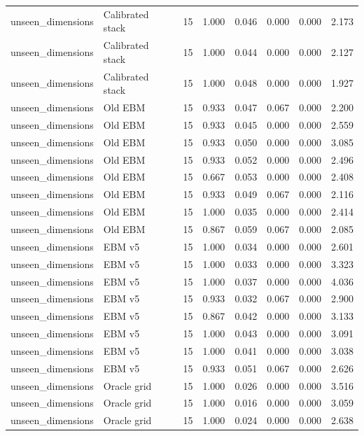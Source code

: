 {\begin{longtable}{llrrrrrr}
unseen\_dimensions & Calibrated stack & 15 & 1.000 & 0.046 & 0.000 & 0.000 & 2.173 \\
unseen\_dimensions & Calibrated stack & 15 & 1.000 & 0.044 & 0.000 & 0.000 & 2.127 \\
unseen\_dimensions & Calibrated stack & 15 & 1.000 & 0.048 & 0.000 & 0.000 & 1.927 \\
unseen\_dimensions & Old EBM & 15 & 0.933 & 0.047 & 0.067 & 0.000 & 2.200 \\
unseen\_dimensions & Old EBM & 15 & 0.933 & 0.045 & 0.000 & 0.000 & 2.559 \\
unseen\_dimensions & Old EBM & 15 & 0.933 & 0.050 & 0.000 & 0.000 & 3.085 \\
unseen\_dimensions & Old EBM & 15 & 0.933 & 0.052 & 0.000 & 0.000 & 2.496 \\
unseen\_dimensions & Old EBM & 15 & 0.667 & 0.053 & 0.000 & 0.000 & 2.408 \\
unseen\_dimensions & Old EBM & 15 & 0.933 & 0.049 & 0.067 & 0.000 & 2.116 \\
unseen\_dimensions & Old EBM & 15 & 1.000 & 0.035 & 0.000 & 0.000 & 2.414 \\
unseen\_dimensions & Old EBM & 15 & 0.867 & 0.059 & 0.067 & 0.000 & 2.085 \\
unseen\_dimensions & EBM v5 & 15 & 1.000 & 0.034 & 0.000 & 0.000 & 2.601 \\
unseen\_dimensions & EBM v5 & 15 & 1.000 & 0.033 & 0.000 & 0.000 & 3.323 \\
unseen\_dimensions & EBM v5 & 15 & 1.000 & 0.037 & 0.000 & 0.000 & 4.036 \\
unseen\_dimensions & EBM v5 & 15 & 0.933 & 0.032 & 0.067 & 0.000 & 2.900 \\
unseen\_dimensions & EBM v5 & 15 & 0.867 & 0.042 & 0.000 & 0.000 & 3.133 \\
unseen\_dimensions & EBM v5 & 15 & 1.000 & 0.043 & 0.000 & 0.000 & 3.091 \\
unseen\_dimensions & EBM v5 & 15 & 1.000 & 0.041 & 0.000 & 0.000 & 3.038 \\
unseen\_dimensions & EBM v5 & 15 & 0.933 & 0.051 & 0.067 & 0.000 & 2.626 \\
unseen\_dimensions & Oracle grid & 15 & 1.000 & 0.026 & 0.000 & 0.000 & 3.516 \\
unseen\_dimensions & Oracle grid & 15 & 1.000 & 0.016 & 0.000 & 0.000 & 3.059 \\
unseen\_dimensions & Oracle grid & 15 & 1.000 & 0.024 & 0.000 & 0.000 & 2.638 \\

\end{longtable}}
